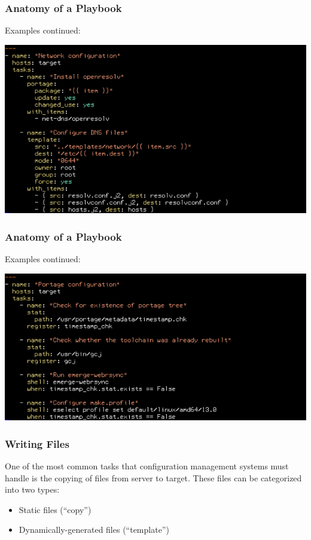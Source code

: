 \documentclass[helvetica,english,utf8,notitle,nologo]{beamer}
\begin{document}
\begin{frame}
  \frametitle{Anatomy of a Playbook}

  Examples continued:

  \includegraphics[scale=0.44]{img_18}
\end{frame}

\begin{frame}
  \frametitle{Anatomy of a Playbook}

  Examples continued:

  \includegraphics[scale=0.44]{img_19}
\end{frame}

\begin{frame}
  \frametitle{Writing Files}

  One of the most common tasks that configuration management systems
  must handle is the copying of files from server to target. These
  files can be categorized into two types:

  \begin{itemize}
  \item Static files (``copy'')
  \item Dynamically-generated files (``template'')
  \end{itemize}
\end{frame}
\end{document}
